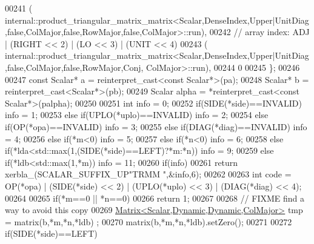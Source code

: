 \begin{DoxyCode}
00241     (
      internal::product\_triangular\_matrix\_matrix<Scalar,DenseIndex,Upper|UnitDiag,false,ColMajor,false,RowMajor,false,ColMajor>::run),
00242     \textcolor{comment}{// array index: ADJ   | (RIGHT << 2) | (LO << 3) | (UNIT  << 4)}
00243     (
      internal::product\_triangular\_matrix\_matrix<Scalar,DenseIndex,Upper|UnitDiag,false,ColMajor,false,RowMajor,Conj, ColMajor>::run),
00244     0
00245   \};
00246 
00247   \textcolor{keyword}{const} Scalar* a = \textcolor{keyword}{reinterpret\_cast<}\textcolor{keyword}{const }Scalar*\textcolor{keyword}{>}(pa);
00248   Scalar* b = \textcolor{keyword}{reinterpret\_cast<}Scalar*\textcolor{keyword}{>}(pb);
00249   Scalar  alpha = *\textcolor{keyword}{reinterpret\_cast<}\textcolor{keyword}{const }Scalar*\textcolor{keyword}{>}(palpha);
00250 
00251   \textcolor{keywordtype}{int} info = 0;
00252   \textcolor{keywordflow}{if}(SIDE(*side)==INVALID)                                            info = 1;
00253   \textcolor{keywordflow}{else} \textcolor{keywordflow}{if}(UPLO(*uplo)==INVALID)                                       info = 2;
00254   \textcolor{keywordflow}{else} \textcolor{keywordflow}{if}(OP(*opa)==INVALID)                                          info = 3;
00255   \textcolor{keywordflow}{else} \textcolor{keywordflow}{if}(DIAG(*diag)==INVALID)                                       info = 4;
00256   \textcolor{keywordflow}{else} \textcolor{keywordflow}{if}(*m<0)                                                       info = 5;
00257   \textcolor{keywordflow}{else} \textcolor{keywordflow}{if}(*n<0)                                                       info = 6;
00258   \textcolor{keywordflow}{else} \textcolor{keywordflow}{if}(*lda<std::max(1,(SIDE(*side)==LEFT)?*m:*n))                 info = 9;
00259   \textcolor{keywordflow}{else} \textcolor{keywordflow}{if}(*ldb<std::max(1,*m))                                        info = 11;
00260   \textcolor{keywordflow}{if}(info)
00261     \textcolor{keywordflow}{return} xerbla\_(SCALAR\_SUFFIX\_UP\textcolor{stringliteral}{"TRMM "},&info,6);
00262 
00263   \textcolor{keywordtype}{int} code = OP(*opa) | (SIDE(*side) << 2) | (UPLO(*uplo) << 3) | (DIAG(*diag) << 4);
00264 
00265   \textcolor{keywordflow}{if}(*m==0 || *n==0)
00266     \textcolor{keywordflow}{return} 1;
00267 
00268   \textcolor{comment}{// FIXME find a way to avoid this copy}
00269   \hyperlink{group___core___module_class_eigen_1_1_matrix}{Matrix<Scalar,Dynamic,Dynamic,ColMajor>} tmp = matrix(b,*m,*n,*ldb)
      ;
00270   matrix(b,*m,*n,*ldb).setZero();
00271 
00272   \textcolor{keywordflow}{if}(SIDE(*side)==LEFT)

\end{DoxyCode}
